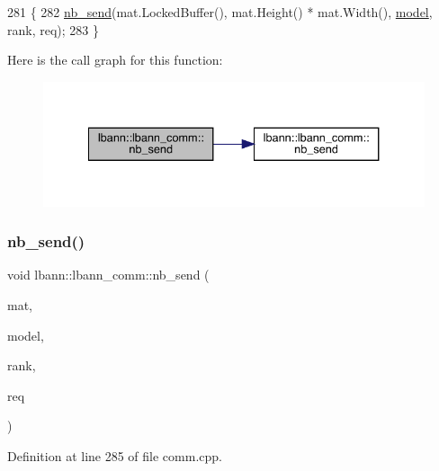 \begin{DoxyCode}
281                                                       \{
282   \hyperlink{classlbann_1_1lbann__comm_a70679ca6477c56972f9bc53d52e5ce21}{nb\_send}(mat.LockedBuffer(), mat.Height() * mat.Width(), \hyperlink{namespacelbann_adee41f31f15f3906cbdcce4a1417eb56a20f35e630daf44dbfa4c3f68f5399d8c}{model}, rank, req);
283 \}
\end{DoxyCode}
Here is the call graph for this function\+:\nopagebreak
\begin{figure}[H]
\begin{center}
\leavevmode
\includegraphics[width=334pt]{classlbann_1_1lbann__comm_ae86cb0f65c8e11dec7a1cf0d3ce17cd2_cgraph}
\end{center}
\end{figure}
\mbox{\label{classlbann_1_1lbann__comm_ad77344b63311b7ec57c63af67120c3e6}} 
\subsubsection{\texorpdfstring{nb\+\_\+send()}{nb\_send()}\hspace{0.1cm}{\footnotesize\ttfamily [4/6]}}
{\footnotesize\ttfamily void lbann\+::lbann\+\_\+comm\+::nb\+\_\+send (\begin{DoxyParamCaption}\item[{const \hyperlink{base_8hpp_a0fab5387556805cfeac3e7e567bf66c5}{Dist\+Mat} \&}]{mat,  }\item[{int}]{model,  }\item[{int}]{rank,  }\item[{El\+::mpi\+::\+Request$<$ Data\+Type $>$ \&}]{req }\end{DoxyParamCaption})}



Definition at line 285 of file comm.\+cpp.


